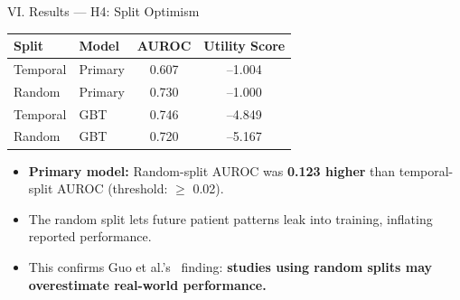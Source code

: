 \begin{frame}{VI. Results --- H4: Split Optimism \confirmed}
\begin{center}\tablestyle
\begin{tabular}{llcc}
\toprule
\textbf{Split} & \textbf{Model} & \textbf{AUROC} & \textbf{Utility Score} \\
\midrule
Temporal & Primary & 0.607 & --1.004 \\
Random   & Primary & 0.730 & --1.000 \\
Temporal & GBT     & 0.746 & --4.849 \\
Random   & GBT     & 0.720 & --5.167 \\
\bottomrule
\end{tabular}
\end{center}

\vspace{6pt}
\begin{itemize}
  \item \textbf{Primary model:} Random-split AUROC was \textbf{0.123 higher}
        than temporal-split AUROC (threshold: $\geq$ 0.02).
  \item The random split lets future patient patterns leak into training,
        inflating reported performance.
  \item This confirms Guo et al.'s~\cite{guo2022temporal} finding:
        \textbf{studies using random splits may overestimate real-world
        performance.}
\end{itemize}
\end{frame}


